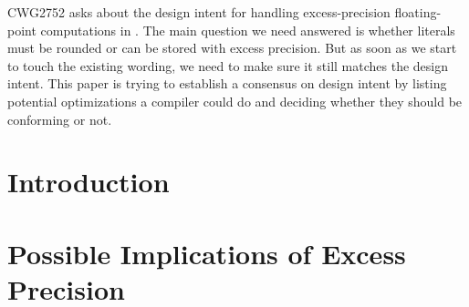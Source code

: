 \newcommand\wgTitle{Floating-Point Excess Precision}
\newcommand\wgName{Matthias Kretz <m.kretz@gsi.de>}
\newcommand\wgDocumentNumber{DFPEPR0}
\newcommand\wgGroup{SG6, EWG, CWG}
\newcommand\wgTarget{\CC{}26}

\usepackage{mymacros}
\usepackage{wg21}
\usepackage{changelog}
\usepackage{underscore}



\renewcommand{\lst}[1]{Listing~\ref{#1}}
\renewcommand{\sect}[1]{Section~\ref{#1}}
\renewcommand{\ttref}[1]{Tony~Table~\ref{#1}}


\begin{wgTitlepage}
  CWG2752 asks about the design intent for handling excess-precision
  floating-point computations in \CC{}.
  The main question we need answered is whether literals must be rounded or can
  be stored with excess precision.
  But as soon as we start to touch the existing wording, we need to make sure
  it still matches the design intent.
  This paper is trying to establish a consensus on design intent by listing
  potential optimizations a compiler could do and deciding whether they should
  be conforming or not.
\end{wgTitlepage}

\pagestyle{scrheadings}

%
%

\section{Introduction}

\section{Possible Implications of Excess Precision}

